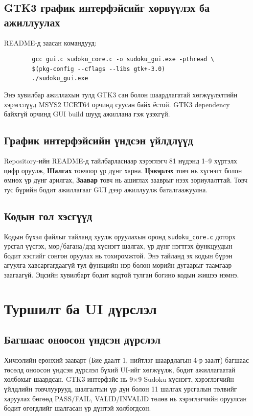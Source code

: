 \documentclass[12pt,a4paper]{report}
\begin{document}
	\section{GTK3 график интерфэйсийг хөрвүүлэх ба ажиллуулах}
	README-д заасан командууд:
	\begin{lstlisting}
		gcc gui.c sudoku_core.c -o sudoku_gui.exe -pthread \
		$(pkg-config --cflags --libs gtk+-3.0)
		./sudoku_gui.exe
	\end{lstlisting}
	Энэ хувилбар ажиллахын тулд GTK3 сан болон шаардлагатай хөгжүүлэлтийн хэрэгслүүд MSYS2 UCRT64 орчинд суусан байх ёстой. GTK3 dependency байхгүй орчинд GUI build шууд ажиллана гэж үзэхгүй.
	
	\section{График интерфэйсийн үндсэн үйлдлүүд}
	Repository-ийн README-д тайлбарласнаар хэрэглэгч 81 нүдэнд 1--9 хүртэлх цифр оруулж, \textbf{Шалгах} товчоор үр дүнг харна. \textbf{Цэвэрлэх} товч нь хүснэгт болон өмнөх үр дүнг арилгах, \textbf{Заавар} товч нь ашиглах зааврыг нээх зориулалттай. Товч тус бүрийн бодит ажиллагааг GUI дээр ажиллуулж баталгаажуулна.
	
	\section{Кодын гол хэсгүүд}
	Кодын бүхэл файлыг тайланд хуулж оруулахын оронд \texttt{sudoku\_core.c} доторх урсгал үүсгэх, мөр/багана/дэд хүснэгт шалгах, үр дүнг нэгтгэх функцуудын бодит хэсгийг сонгон оруулах нь тохиромжтой. Энэ тайланд эх кодын бүрэн агуулга хавсаргагдаагүй тул функцийн нэр болон мөрийн дугаарыг таамгаар заагаагүй. Эцсийн хувилбарт бодит кодтой тулган богино кодын жишээ нэмнэ.
	
	\chapter{Туршилт ба UI дүрслэл}
	
	\section{Багшаас оноосон үндсэн дүрслэл}
	Хичээлийн ерөнхий зааварт (Бие даалт 1, нийтлэг шаардлагын 4-р заалт) багшаас төсөлд оноосон үндсэн дүрслэл бүхий UI-ийг хөгжүүлж, бодит ажиллагаатай холбохыг шаардсан. GTK3 интерфэйс нь 9$\times$9 Sudoku хүснэгт, хэрэглэгчийн үйлдлийн товчлуурууд, шалгалтын үр дүн болон 11 шалгах урсгалын төлвийг харуулах бөгөөд PASS/FAIL, VALID/INVALID төлөв нь хэрэглэгчийн оруулсан бодит өгөгдлийг шалгасан үр дүнтэй холбогдсон.
\end{document}
